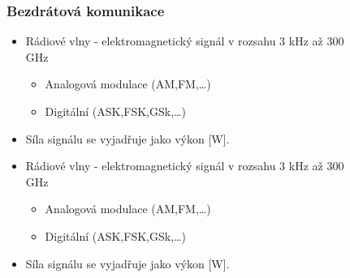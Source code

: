 \begin{figure}[h]
\subsubsection*{Bezdrátová komunikace}
\begin{itemize}
  \item Rádiové vlny - elektromagnetický signál v rozsahu 3 kHz až 300 GHz \begin{itemize}
    \item Analogová modulace (AM,FM,\dots)
    \item Digitální (ASK,FSK,GSk,\dots)
  \end{itemize}
  \item Síla signálu se vyjadřuje jako výkon [W].
    \item Rádiové vlny - elektromagnetický signál v rozsahu 3 kHz až 300 GHz \begin{itemize}
              \item Analogová modulace (AM,FM,\dots)
              \item Digitální (ASK,FSK,GSk,\dots)
          \end{itemize}
    \item Síla signálu se vyjadřuje jako výkon [W].
\end{itemize}


\end{figure}
